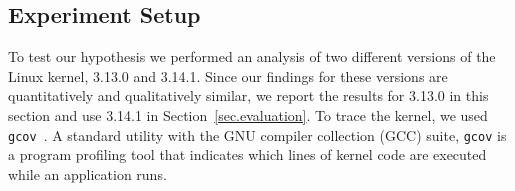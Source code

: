 



%
%

\subsection{Experiment Setup}

To test our hypothesis we performed an analysis of two different versions of
the Linux kernel, 3.13.0 and 3.14.1. Since our findings for these
versions are quantitatively and qualitatively similar, we report
the results for 3.13.0 in this section and use 3.14.1 in Section~\ref{sec.evaluation}.
To trace the kernel, we used \texttt{gcov}~\cite{gcov}. A standard utility with
the GNU compiler collection (GCC) suite,
\texttt{gcov} is a program profiling tool that indicates which lines of kernel
code are executed while an application runs. 

